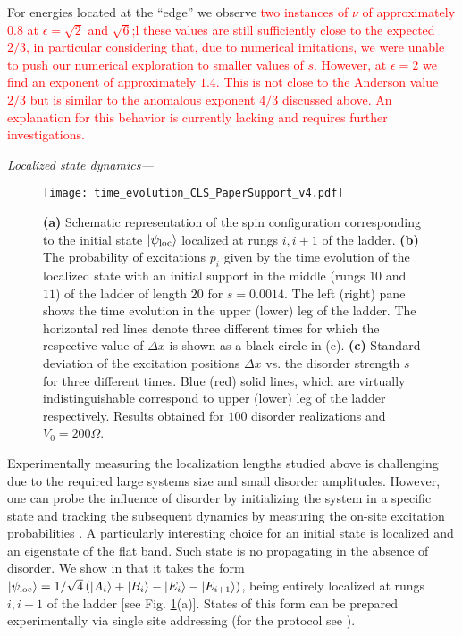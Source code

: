 \documentclass[prl,aps,twocolumn,showpacs,superscriptaddress,longbibliography]{revtex4-1}
\newcommand{\ran}{\right\rangle}
\newcommand{\ket}[1]{\left| #1 \ran}
\newcommand{\changer}[1]{\textcolor{red}{#1}}
\begin{document}
For energies located at the ``edge'' we observe \changer{two instances of $\nu$ of approximately $0.8$ at $\epsilon = \sqrt{2}$ and $\sqrt{6}$;l these values are still sufficiently close to the expected $2/3$, in particular considering that, due to numerical imitations, we were unable to push our numerical exploration to smaller values of $s$. However, at $\epsilon = 2$ we find an exponent of approximately $1.4$. This is not close to the Anderson value $2/3$ but is similar to the anomalous exponent $4/3$ discussed above. An explanation for this behavior is currently lacking and requires further investigations.}


%

\emph{Localized state dynamics---}
\begin{figure}
\texttt{[image: time\_evolution\_CLS\_PaperSupport\_v4.pdf]}
\caption{\textbf{(a)} Schematic representation of the spin configuration corresponding to the initial state $\ket{\psi_{\rm loc}}$ localized at rungs $i,i+1$ of the ladder. \textbf{(b)} The probability of excitations $p_i$ given by the time evolution of the localized state with an initial support in the middle (rungs $10$ and $11$) of the ladder of length $20$ for $s=0.0014$. The left (right) pane shows the time evolution in the upper (lower) leg of the ladder. The horizontal red lines denote three different times for which the respective value of $\Delta x$ is shown as a black circle in (c). \textbf{(c)} Standard deviation of the excitation positions $\Delta x$ vs. the disorder strength $s$ for three different times. Blue (red) solid lines, which are virtually indistinguishable correspond to upper (lower) leg of the ladder respectively. Results obtained for $100$ disorder realizations and $V_0=200\Omega$.}
\label{Fig:time evolution}
\end{figure}
Experimentally measuring the localization lengths studied above is challenging due to the required large systems size and small disorder amplitudes. However, one can probe the influence of disorder by initializing the system in a specific state and tracking the subsequent dynamics by measuring the on-site excitation probabilities \cite{Schauss_2015,Labuhn_2015,Bernien2017}. A particularly interesting choice for an initial state is localized and an eigenstate of the flat band. Such state is no propagating in the absence of disorder. We show in \cite{SM} that it takes the form $\ket{\psi_{\rm loc}} = 1/\sqrt{4} \left( \ket{A_i} + \ket{B_i} - \ket{E_i} - \ket{E_{i+1}} \right)$, being entirely localized at rungs $i,i+1$ of the ladder [see Fig. \ref{Fig:time evolution}(a)]. States of this form can be prepared experimentally via single site addressing (for the protocol see \cite{SM}).
\end{document}
